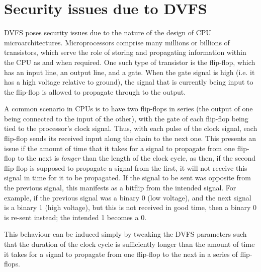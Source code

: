 \section{Security issues due to DVFS}
\label{sec:dvfs-security}

DVFS poses security issues due to the nature of the design of CPU
microarchitectures. Microprocessors comprise many millions or billions of
transistors, which serve the role of storing and propagating information within
the CPU as and when required. One such type of transistor is the flip-flop,
which has an input line, an output line, and a gate. When the gate signal is
high (i.e. it has a high voltage relative to ground), the signal that is
currently being input to the flip-flop is allowed to propagate through to the
output.

A common scenario in CPUs is to have two flip-flops in series (the
output of one being connected to the input of the other), with the gate of each
flip-flop being tied to the processor's clock signal. Thus, with each pulse of
the clock signal, each flip-flop sends its received input along the chain to the
next one. This presents an issue if the amount of time that it takes for a
signal to propagate from one flip-flop to the next is \emph{longer} than the
length of the clock cycle, as then, if the second flip-flop is supposed to
propagate a signal from the first, it will not receive this signal in time for
it to be propagated. If the signal to be sent was opposite from the previous
signal, this manifests as a bitflip from the intended signal. For example, if
the previous signal was a binary 0 (low voltage), and the next signal is a
binary 1 (high voltage), but this is not received in good time, then a binary 0
is re-sent instead; the intended 1 becomes a 0.

This behaviour can be induced simply by tweaking the DVFS parameters such that
the duration of the clock cycle is sufficiently longer than the amount of time
it takes for a signal to propagate from one flip-flop to the next in a series
of flip-flops.
